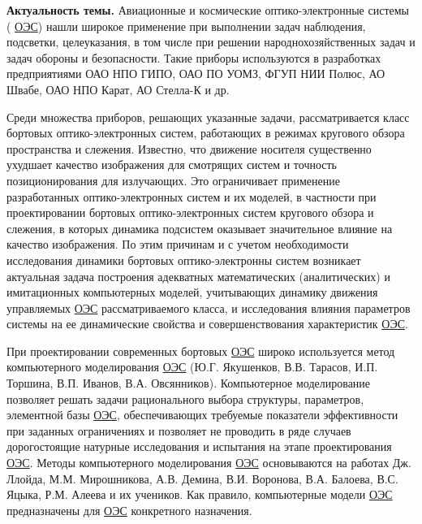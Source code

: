 
{\actuality} \textbf{Актуальность темы.} Авиационные и космические оптико-электронные системы ( \hyperref[acroEOS]{ОЭС}) нашли широкое применение при выполнении задач наблюдения, подсветки, целеуказания, в том числе при решении народнохозяйственных задач и задач обороны и безопасности. Такие приборы используются в разработках предприятиями ОАО НПО ГИПО, ОАО ПО УОМЗ, ФГУП НИИ Полюс, АО Швабе, ОАО НПО Карат, АО Стелла-К и др. 

Среди множества приборов, решающих указанные задачи, рассматривается класс бортовых оптико-электронных систем, работающих в режимах кругового обзора пространства и слежения. Известно, что движение носителя существенно ухудшает качество изображения для смотрящих систем и точность позиционирования для излучающих. Это ограничивает применение разработанных оптико-электронных систем и их моделей, в частности при проектировании бортовых оптико-электронных систем кругового обзора и слежения, в которых динамика подсистем оказывает значительное влияние на качество изображения. По этим причинам и с учетом необходимости исследования динамики бортовых оптико-электронны систем возникает актуальная задача построения адекватных математических (аналитических) и имитационных компьютерных моделей, учитывающих динамику движения управляемых \hyperref[acroEOS]{ОЭС} рассматриваемого класса, и исследования влияния параметров системы на ее динамические свойства и совершенствования характеристик \hyperref[acroEOS]{ОЭС}.

При проектировании современных бортовых  \hyperref[acroEOS]{ОЭС} широко используется метод компьютерного моделирования  \hyperref[acroEOS]{ОЭС} (Ю.Г. Якушенков, В.В. Тарасов, И.П. Торшина, В.П. Иванов, В.А. Овсянников). Компьютерное моделирование позволяет решать задачи рационального выбора структуры, параметров, элементной базы  \hyperref[acroEOS]{ОЭС}, обеспечивающих требуемые показатели эффективности при заданных ограничениях и позволяет не проводить в ряде случаев дорогостоящие натурные исследования и испытания на этапе проектирования  \hyperref[acroEOS]{ОЭС}. Методы компьютерного моделирования  \hyperref[acroEOS]{ОЭС} основываются на работах Дж. Ллойда, М.М. Мирошникова, А.В. Демина, В.И. Воронова, В.А. Балоева, В.С. Яцыка, Р.М.  Алеева и их учеников. Как правило, компьютерные модели  \hyperref[acroEOS]{ОЭС} предназначены для  \hyperref[acroEOS]{ОЭС} конкретного назначения. 

